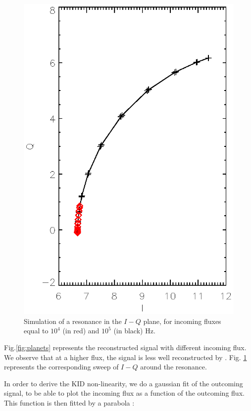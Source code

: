 \begin{figure}[h]
\center
\includegraphics[scale=0.8]{Figures/resonance.eps}
\caption{Simulation of a resonance in the $I-Q$ plane, for incoming fluxes equal to $10^{4}$ (in red) and $10^{5}$ (in black) Hz.}
\label{fig:resonance}
\end{figure}

Fig.\ref{fig:planets} represents the reconstructed signal with different incoming flux. We observe that at a higher flux, the signal is less well reconstructed by \rf. Fig. \ref{fig:resonance} represents the corresponding sweep of $I-Q$ around the resonance.

In order to derive the KID non-linearity, we do a gaussian fit of the outcoming signal, to be able to plot the incoming flux as a function of the outcoming flux. This function is then fitted by a parabola :

